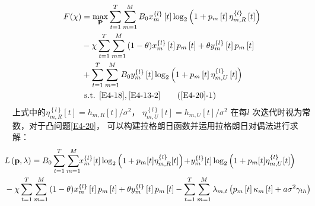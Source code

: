 \begin{align} \notag
F(\chi)&=  \max _{ \mathbf{P}} \sum_{t=1}^T \sum_{m=1}^M {B}_{0}x_{m}^{\left\{ l \right\}}\left[ t \right] %
\log_2{\left(1+p_m\left[t\right]\eta_{m,R}^{\left\{ l \right\}}\left[t\right]\right)}                         \\       \label{E4-20}
& -\chi \sum_{t=1}^T \sum_{m=1}^M{(1-\theta)x_{m}^{\left\{ l \right\}}\left[ t \right]p_m\left[t\right]
+\theta y_{m}^{\left\{ l \right\}}\left[ t \right]p_m\left[t\right]}                                                           \\ \notag
& + \sum_{t=1}^T \sum_{m=1}^M {B}_{0}y_{m}^{\left\{ l \right\}}\left[ t \right]
\log_2{\left(1+p_m\left[t\right]\eta_{m,U}^{\left\{ l \right\}}\left[t\right]\right)}                                          \\ \notag
&\text { s.t. }
\eqref{E4-18},\eqref{E4-13-2}                                                           \tag{\ref{E4-20}{-1}}       \label{E4-20-1}
\end{align}
上式中的$\eta_{m,R}^{\left\{ l \right\}}\left[t\right]=h_{m,R}\left[t\right]/{\sigma^2}$，
$\eta_{m,U}^{\left\{ l \right\}}\left[t\right]=h_{m,U}\left[t\right]/{\sigma^2}$
在每$l$ 次迭代时视为常数，对于凸问题\eqref{E4-20}，
可以构建拉格朗日函数并运用拉格朗日对偶法进行求解：
\begin{align} \label{E4-21}
&\!\!\!\!\!\!L\left(\mathbf{p},\lambda\right)=B_{0}\sum_{t=1}^{T} \sum_{m=1}^{M}  \!\! x_{m}^{\{ l \}}[t] \log_{2}\left(1 + p_{m}[t]\eta_{m,R}^{\{ l \}}[t]\right) \! +\!  y_{m}^{\{ l \}}[t] \log_{2}\left(1 + p_{m}[t]\eta_{m,U}^{\{ l \}}[t]\right)  \\
&\!\!\!\!\!\!-\chi \sum_{t=1}^T \sum_{m=1}^M{(1-\theta)x_{m}^{\left\{ l \right\}}\left[ t \right]p_m\left[t\right]
+\theta y_{m}^{\left\{ l \right\}}\left[ t \right]p_m\left[t\right]} %
-\sum\limits_{t=1}^{T}{\sum\limits_{m=1}^{M}{{{\lambda }_{m,t}}}}\left( {{p}_{m}}\left[ t \right]{{\kappa }_{m}}\left[ t \right]+a{{\sigma }^{2}}{{\gamma }_{th}} \right) \notag
\end{align}

